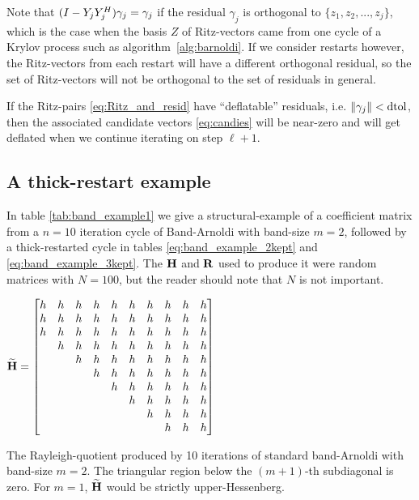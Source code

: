 Note that $(I-Y_jY_j^H) \gamma_j = \gamma_j$ if the residual $\gamma_j$ is orthogonal to $\{z_1,z_2,...,z_j\}$, which is the case when the basis $Z$ of Ritz-vectors came from one cycle of a Krylov process such as algorithm~\ref{alg:barnoldi}.   If we consider restarts however, the Ritz-vectors from each restart will have a different orthogonal residual, so the set of  Ritz-vectors will not be orthogonal to the set of residuals in general. 

If the Ritz-pairs \eqref{eq:Ritz_and_resid} have ``deflatable'' residuals, i.e. $\| \gamma_j \| < \text{dtol}$, then the associated candidate vectors \eqref{eq:candies} will be near-zero and will get deflated when we continue iterating on step $\ell+1$.

\subsection{A thick-restart example}
In table \ref{tab:band_example1} we give a structural-example of a coefficient matrix from a $n=10$ iteration cycle of Band-Arnoldi with band-size $m=2$, followed by a thick-restarted cycle in tables \ref{eq:band_example_2kept} and  \ref{eq:band_example_3kept}.  The $\textbf{\textup{H}}$ and $\textbf{\textup{R}}$ used to produce it were random matrices with $N=100$, but the reader should note that $N$ is not important.  


\begin{table}
\centering
$ \widetilde{\textbf{\textup{H}}} = \begin{bmatrix} 
 h & h & h & h & h & h & h & h & h & h \\
 h & h & h & h & h & h & h & h & h & h \\
 h & h & h & h & h & h & h & h & h & h \\
  & h & h & h & h & h & h & h & h & h \\
  &  & h & h & h & h & h & h & h & h \\
  &  &  & h & h & h & h & h & h & h \\
  &  &  &  & h & h & h & h & h & h \\
  &  &  &  &  & h & h & h & h & h \\
  &  &  &  &  &  & h & h & h & h \\
  &  &  &  &  &  &  & h & h & h \\
\end{bmatrix}$ 
\caption{\label{tab:band_example1}The Rayleigh-quotient produced by 10 iterations of standard  band-Arnoldi with band-size $m=2$. The triangular region below the $(m+1)$-th subdiagonal is zero.  For $m=1$, $\widetilde{\textbf{\textup{H}}}$ would be strictly upper-Hessenberg.} 
\end{table}

